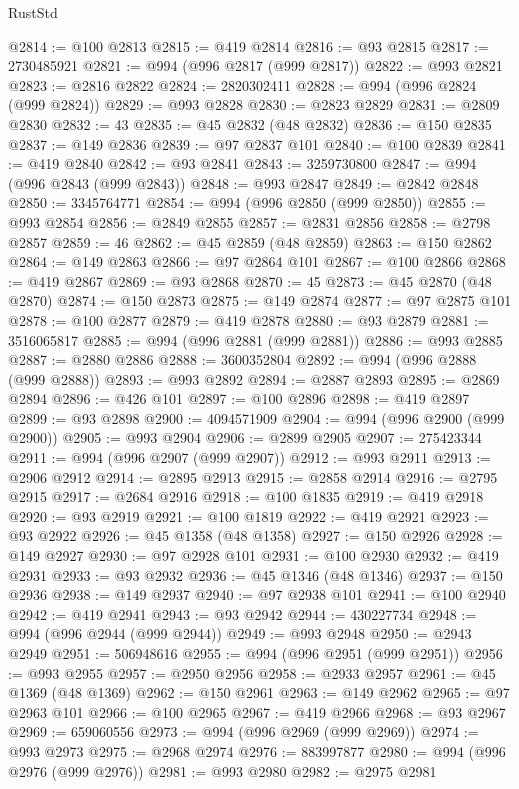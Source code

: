\begin{lexlean}{RustStd}
\begin{coremodule}
@2814 := @100 @2813
@2815 := @419 @2814
@2816 := @93 @2815
@2817 := 2730485921
@2821 := @994 (@996 @2817 (@999 @2817))
@2822 := @993 @2821
@2823 := @2816 @2822
@2824 := 2820302411
@2828 := @994 (@996 @2824 (@999 @2824))
@2829 := @993 @2828
@2830 := @2823 @2829
@2831 := @2809 @2830
@2832 := 43
@2835 := @45 @2832 (@48 @2832)
@2836 := @150 @2835
@2837 := @149 @2836
@2839 := @97 @2837 @101
@2840 := @100 @2839
@2841 := @419 @2840
@2842 := @93 @2841
@2843 := 3259730800
@2847 := @994 (@996 @2843 (@999 @2843))
@2848 := @993 @2847
@2849 := @2842 @2848
@2850 := 3345764771
@2854 := @994 (@996 @2850 (@999 @2850))
@2855 := @993 @2854
@2856 := @2849 @2855
@2857 := @2831 @2856
@2858 := @2798 @2857
@2859 := 46
@2862 := @45 @2859 (@48 @2859)
@2863 := @150 @2862
@2864 := @149 @2863
@2866 := @97 @2864 @101
@2867 := @100 @2866
@2868 := @419 @2867
@2869 := @93 @2868
@2870 := 45
@2873 := @45 @2870 (@48 @2870)
@2874 := @150 @2873
@2875 := @149 @2874
@2877 := @97 @2875 @101
@2878 := @100 @2877
@2879 := @419 @2878
@2880 := @93 @2879
@2881 := 3516065817
@2885 := @994 (@996 @2881 (@999 @2881))
@2886 := @993 @2885
@2887 := @2880 @2886
@2888 := 3600352804
@2892 := @994 (@996 @2888 (@999 @2888))
@2893 := @993 @2892
@2894 := @2887 @2893
@2895 := @2869 @2894
@2896 := @426 @101
@2897 := @100 @2896
@2898 := @419 @2897
@2899 := @93 @2898
@2900 := 4094571909
@2904 := @994 (@996 @2900 (@999 @2900))
@2905 := @993 @2904
@2906 := @2899 @2905
@2907 := 275423344
@2911 := @994 (@996 @2907 (@999 @2907))
@2912 := @993 @2911
@2913 := @2906 @2912
@2914 := @2895 @2913
@2915 := @2858 @2914
@2916 := @2795 @2915
@2917 := @2684 @2916
@2918 := @100 @1835
@2919 := @419 @2918
@2920 := @93 @2919
@2921 := @100 @1819
@2922 := @419 @2921
@2923 := @93 @2922
@2926 := @45 @1358 (@48 @1358)
@2927 := @150 @2926
@2928 := @149 @2927
@2930 := @97 @2928 @101
@2931 := @100 @2930
@2932 := @419 @2931
@2933 := @93 @2932
@2936 := @45 @1346 (@48 @1346)
@2937 := @150 @2936
@2938 := @149 @2937
@2940 := @97 @2938 @101
@2941 := @100 @2940
@2942 := @419 @2941
@2943 := @93 @2942
@2944 := 430227734
@2948 := @994 (@996 @2944 (@999 @2944))
@2949 := @993 @2948
@2950 := @2943 @2949
@2951 := 506948616
@2955 := @994 (@996 @2951 (@999 @2951))
@2956 := @993 @2955
@2957 := @2950 @2956
@2958 := @2933 @2957
@2961 := @45 @1369 (@48 @1369)
@2962 := @150 @2961
@2963 := @149 @2962
@2965 := @97 @2963 @101
@2966 := @100 @2965
@2967 := @419 @2966
@2968 := @93 @2967
@2969 := 659060556
@2973 := @994 (@996 @2969 (@999 @2969))
@2974 := @993 @2973
@2975 := @2968 @2974
@2976 := 883997877
@2980 := @994 (@996 @2976 (@999 @2976))
@2981 := @993 @2980
@2982 := @2975 @2981

\end{coremodule}
\end{lexlean}
